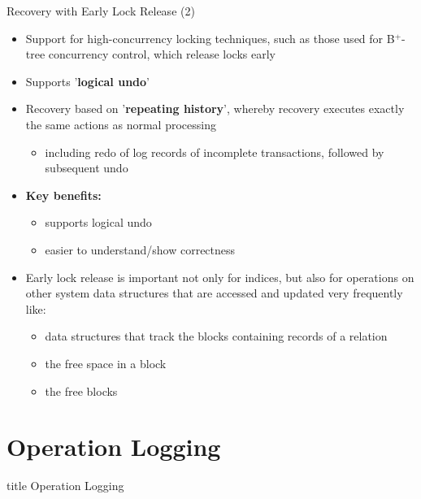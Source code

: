 \documentclass[aspectratio=169, xcolor=dvipsnames]{beamer}
\begin{document}
\begin{frame}{Recovery with Early Lock Release (2)}
    \begin{itemize}[<+->]
        \item Support for high-concurrency locking techniques, such as those used for B$^+$-tree concurrency control, which release locks early
        \item Supports '\textbf{logical undo}'
        \item Recovery based on '\textbf{repeating history}', whereby recovery executes exactly the same actions as normal processing
        \begin{itemize}
            \item[$\triangleright$] including redo of log records of incomplete transactions, followed by subsequent undo
        \end{itemize}
        \item \textbf{Key benefits:}
        \begin{itemize}
            \item[$\triangleright$] supports logical undo
            \item[$\triangleright$] easier to understand/show correctness
        \end{itemize}
        \item Early lock release is important not only for indices, but also for operations on other system data structures that are accessed and updated very frequently like:
        \begin{itemize}
            \item[$\triangleright$] data structures that track the blocks containing records of a relation
            \item[$\triangleright$] the free space in a block
            \item[$\triangleright$] the free blocks
        \end{itemize}
    \end{itemize}
\end{frame}

\section{Operation Logging}

\begin{frame}
  \vfill
  \centering
  \begin{beamercolorbox}[sep=8pt,center,shadow=true,rounded=true]{title}
    Operation Logging\par%
  \end{beamercolorbox}
  \vfill
\end{frame}
\end{document}
